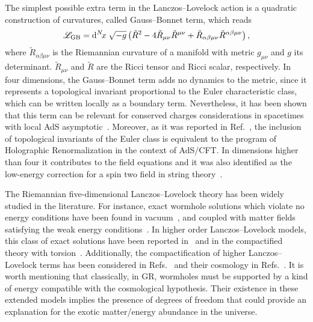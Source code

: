 \documentclass[aps,prd,12pt,superscriptaddress,showpacs,showkeys,reprint,nofootinbib]{revtex4-1}
\begin{document}
The simplest possible extra term in the Lanczos--Lovelock action  is a quadratic construction of curvatures, called Gauss--Bonnet term, which reads
\begin{equation}\label{GB}
  \mathcal{L}_{\mathrm{GB}} = {\mathrm{d}}^{N}\!{x}\;\sqrt{-g}\left(\tilde{R}^2-4\tilde{R}_{\mu\nu}\tilde{R}^{\mu\nu}+\tilde{R}_{\alpha\beta\mu\nu}
  \tilde{R}^{\alpha\beta\mu\nu}\right),
\end{equation}
where $\tilde{R}_{\alpha\beta\mu\nu}$ is the Riemannian curvature of a
manifold with metric $g_{\mu\nu}$ and $g$ its
determinant. $\tilde{R}_{\mu\nu}$ and $\tilde{R}$ are the Ricci tensor
and Ricci scalar, respectively. In four dimensions, the Gauss--Bonnet
term adds no dynamics to the metric, since it represents a topological
invariant proportional to the Euler characteristic class, which can be
written locally as a boundary term. Nevertheless, it has been shown
that this term can be relevant for conserved charges considerations in
spacetimes with local AdS asymptotic~\cite{Aros:1999id}. Moreover, as
it was reported in Ref.~\cite{Miskovic:2009bm}, the inclusion of
topological invariants of the Euler class is equivalent to the program
of Holographic Renormalization in the context of AdS/CFT. In
dimensions higher than four it contributes to the field equations and
it was also identified as the low-energy correction for a spin two
field in string theory~\cite{Zwiebach:1985uq}.

The Riemannian five-dimensional Lanczos--Lovelock theory has been
widely studied in the literature. For instance, exact wormhole
solutions which violate no energy conditions have been found in
vacuum~\cite{Dotti:2006cp,*Dotti:2007az}, and coupled with matter
fields satisfying the weak energy
conditions~\cite{Mehdizadeh:2015jra}. In higher order
Lanczos--Lovelock models, this class of exact solutions have been
reported in~\cite{Mehdizadeh:2015dta} and in the compactified theory
with torsion~\cite{Canfora:2008ka}. Additionally, the compactification
of higher Lanczos--Lovelock terms has been considered in
Refs.~\cite{MuellerHoissen:1985mm,*MuellerHoissen:1989yv} and their
cosmology in
Refs.~\cite{MuellerHoissen:1985ij,Deruelle:1986iv,Deruelle:1989fj}. It
is worth mentioning that classically, in GR, wormholes must be supported by
a kind of energy compatible with the cosmological hypothesis. Their
existence in these extended models implies the presence of degrees of
freedom that could provide an explanation for the exotic matter/energy
abundance in the universe.
\end{document}
